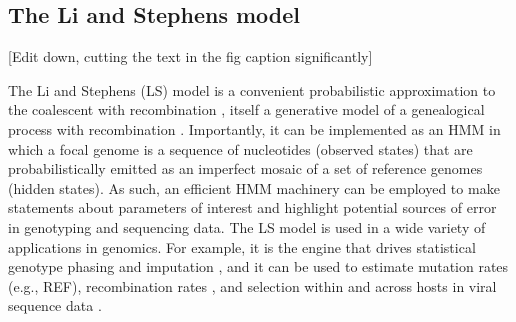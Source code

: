 \documentclass{article}
\begin{document}
\subsection{The Li and Stephens model}
[Edit down, cutting the text in the fig caption significantly]

The Li and Stephens (LS) model is
a convenient probabilistic approximation to the coalescent with recombination
\citep{Hudson1983-properties}, itself a generative model of a genealogical process with
recombination \citep{Li2003-ib}. Importantly, it can be implemented as an HMM
in which a focal genome is a sequence of nucleotides (observed states) that are
probabilistically emitted as an imperfect mosaic of a set of reference genomes
(hidden states). As such, an efficient HMM machinery can be employed to make
statements about parameters of interest and highlight potential sources of
error in genotyping and sequencing data. The LS model is used in a wide variety
of applications in genomics. For example, it is the engine that drives
statistical genotype phasing and imputation
\citep{Delaneau2019-wl,Browning2021-cg,Browning2018-nk,Rubinacci2020-pa}, and
it can be used to estimate mutation rates (e.g., REF), recombination rates
\citep[e.g.][]{Hinch2011-tz}, and selection within and across hosts in viral
sequence data \citep[e.g.][]{Palmer2019-wa}.
\end{document}
